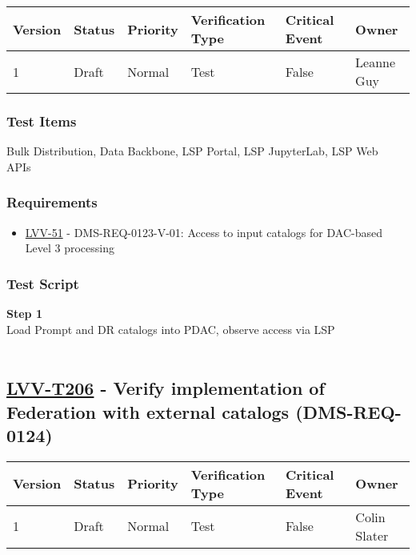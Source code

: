 \begin{longtable}[]{@{}llllll@{}}
\toprule
Version & Status & Priority & Verification Type & Critical Event &
Owner\tabularnewline
\midrule
\endhead
1 & Draft & Normal & Test & False & Leanne Guy\tabularnewline
\bottomrule
\end{longtable}

\hypertarget{test-items-181}{%
\subsubsection{Test Items}\label{test-items-181}}

Bulk Distribution, Data Backbone, LSP Portal, LSP JupyterLab, LSP Web
APIs~

\hypertarget{requirements-182}{%
\subsubsection{Requirements}\label{requirements-182}}

\begin{itemize}
\tightlist
\item
  \href{https://jira.lsstcorp.org/browse/LVV-51}{LVV-51} -
  DMS-REQ-0123-V-01: Access to input catalogs for DAC-based Level 3
  processing
\end{itemize}

\hypertarget{test-script-182}{%
\subsubsection{Test Script}\label{test-script-182}}

\textbf{Step 1}\\
Load Prompt and DR catalogs into PDAC, observe access via LSP\\
~\\

\hypertarget{lvv-t206---verify-implementation-of-federation-with-external-catalogs-dms-req-0124}{%
\subsection{\texorpdfstring{\href{https://jira.lsstcorp.org/secure/Tests.jspa\#/testCase/LVV-T206}{LVV-T206}
- Verify implementation of Federation with external catalogs
(DMS-REQ-0124)}{LVV-T206 - Verify implementation of Federation with external catalogs (DMS-REQ-0124)}}\label{lvv-t206---verify-implementation-of-federation-with-external-catalogs-dms-req-0124}}

\begin{longtable}[]{@{}llllll@{}}
\toprule
Version & Status & Priority & Verification Type & Critical Event &
Owner\tabularnewline
\midrule
\endhead
1 & Draft & Normal & Test & False & Colin Slater\tabularnewline
\bottomrule
\end{longtable}

